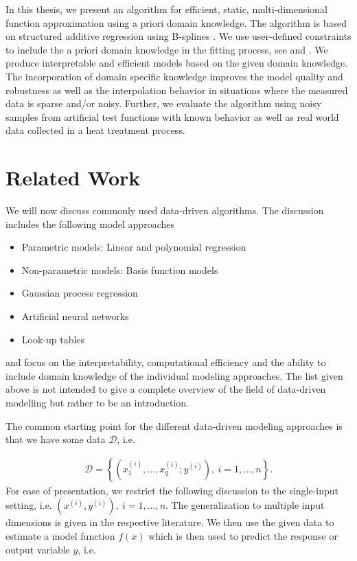 In this thesis, we present an algorithm for efficient, static, multi-dimensional function approximation using a priori domain knowledge. The algorithm is based on structured additive regression using B-splines \cite{fahrmeir2007regression}. We use user-defined constraints to include the a priori domain knowledge in the fitting process, see \cite{hofner2011monotonicity} and \cite{bollaerts2006simple}. We produce interpretable and efficient models based on the given domain knowledge. The incorporation of domain specific knowledge improves the model quality and robustness as well as the interpolation behavior in situations where the measured data is sparse and/or noisy. Further, we evaluate the algorithm using noisy samples from artificial test functions with known behavior as well as real world data collected in a heat treatment process. 
\section{Related Work}

We will now discuss commonly used data-driven algorithms. The discussion includes the following model approaches

\begin{itemize}
	\item Parametric models: Linear and polynomial regression
	\item Non-parametric models: Basis function models
	\item Gaussian process regression
	\item Artificial neural networks
	\item Look-up tables
\end{itemize}
%
and focus on the interpretability, computational efficiency and the ability to include domain knowledge of the individual modeling approaches. The list given above is not intended to give a complete overview of the field of data-driven modelling but rather to be an introduction.

The common starting point for the different data-driven modeling approaches is that we have some data $\mathcal{D}$, i.e.

\begin{align}
	\mathcal{D} = \left\{ (x_1^{(i)}, \dots, x_q^{(i)}; y^{(i)} ), \ i = 1, \dots, n\right\}.
\end{align} 
%
For ease of presentation, we restrict the following discussion to the single-input setting, i.e. $(x^{(i)}, y^{(i)}), \ i=1, \dots, n$. The generalization to multiple input dimensions is given in the respective literature. We then use the given data to estimate a model function $f(x)$  which is then used to predict the response or output variable $y$, i.e.

